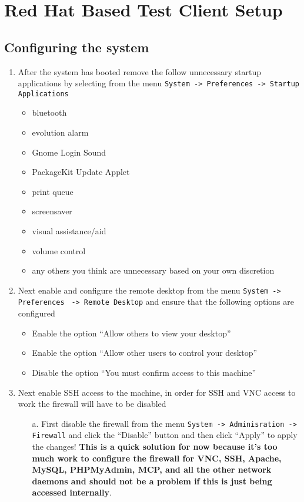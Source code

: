 \section{Red Hat Based Test Client Setup}
\subsection{Configuring the system}
\label{sec:rhconfig}
\begin{enumerate}
\item 	After the system has booted remove the follow unnecessary startup applications by selecting from the menu  
		\verb|System -> Preferences -> Startup Applications|
\begin{itemize}
\item	bluetooth
\item	evolution alarm
\item	Gnome Login Sound
\item	PackageKit Update Applet
\item	print queue
\item	screensaver
\item	visual assistance/aid
\item	volume control
\item	any others you think are unnecessary based on your own discretion
\end{itemize}

\item	Next enable and configure the remote desktop from the menu \verb|System -> Preferences| \verb| -> Remote Desktop| 
		and ensure that the following options are configured	
\begin{itemize}
\item	Enable the option ``Allow others to view your desktop''
\item	Enable the option ``Allow other users to control your desktop''
\item	Disable the option ``You must confirm access to this machine''
\end{itemize}

\item	Next enable SSH access to the machine, in order for SSH and VNC access to work the firewall will have to be disabled
\begin{itemize}
\item[a.]	First disable the firewall from the menu \verb|System -> Adminisration -> Firewall| and click the ``Disable'' 
			button and then click ``Apply'' to apply the changes! {\bf This is a quick solution for now because it's too 
			much work to configure the firewall for VNC, SSH, Apache, MySQL, PHPMyAdmin, MCP, and all the other network 
			daemons and should not be a problem if this is just being accessed internally}.


\end{itemize}
\end{enumerate}
